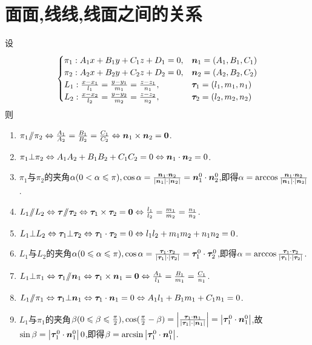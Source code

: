 \section{面面,线线,线面之间的关系}
\begin{proposition}
    设$$\begin{cases}
        \pi_1:A_1x+B_1y+C_1z+D_1=0,&\bm{n}_1=(A_1,B_1,C_1)\\
        \pi_2:A_2x+B_2y+C_2z+D_2=0,&\bm{n}_2=(A_2,B_2,C_2)\\
        L_1:\frac{x-x_1}{l_1}=\frac{y-y_1}{m_1}=\frac{z-z_1}{n_1},&\bm{\tau}_1=(l_1,m_1,n_1)\\
        L_2:\frac{x-x_2}{l_2}=\frac{y-y_2}{m_2}=\frac{z-z_2}{n_2},&\bm{\tau}_2=(l_2,m_2,n_2)
    \end{cases}$$
    则\begin{enumerate}
        \item $\pi_1/\!\!/\pi_2\Leftrightarrow\frac{A_1}{A_2}=\frac{B_1}{B_2}=\frac{C_1}{C_2}\Leftrightarrow\bm{n}_1\times\bm{n}_2=\bm{0}$.
        \item $\pi_1\bot\pi_2\Leftrightarrow A_1A_2+B_1B_2+C_1C_2=0\Leftrightarrow\bm{n}_1\cdot\bm{n}_2=0$.
        \item $\pi_1$与$\pi_2$的夹角$\alpha(0<\alpha\leqslant\pi),\cos\alpha=\frac{\bm{n}_1\cdot\bm{n}_2}{\left|\bm{n}_1\right|\cdot\left|\bm{n}_2\right|}=\bm{n}_1^0\cdot\bm{n}_2^0$,即得$\alpha=\arccos\frac{\bm{n}_1\cdot\bm{n}_2}{\left|\bm{n}_1\right|\cdot\left|\bm{n}_2\right|}$.
        \item $L_1/\!\!/ L_2\Leftrightarrow\bm{\tau}/\!\!/\bm{\tau}_2\Leftrightarrow\bm{\tau}_1\times\bm{\tau}_2=\bm{0}\Leftrightarrow\frac{l_1}{l_2}=\frac{m_1}{m_2}=\frac{n_1}{n_2}$.
        \item $L_1\bot L_2\Leftrightarrow\bm{\tau}_1\bot\bm{\tau}_2\Leftrightarrow\bm{\tau}_1\cdot\bm{\tau}_2=0\Leftrightarrow l_1l_2+m_1m_2+n_1n_2=0$.
        \item $L_1$与$L_2$的夹角$\alpha(0\leqslant\alpha\leqslant\pi),\cos\alpha=\frac{\bm{\tau}_1\cdot\bm{\tau}_2}{\left|\bm{\tau}_1\right|\cdot\left|\bm{\tau}_2\right|}=\bm{\tau}_1^0\cdot\bm{\tau}_2^0$,即得$\alpha=\arccos\frac{\bm{\tau}_1\cdot\bm{\tau}_2}{\left|\bm{\tau}_1\right|\cdot\left|\bm{\tau}_2\right|}$.
        \item $L_1\bot\pi_1\Leftrightarrow\bm{\tau}_1/\!\!/\bm{n}_1\Leftrightarrow\bm{\tau}_1\times\bm{n}_1=\bm{0}\Leftrightarrow \frac{A_1}{l_1}=\frac{B_1}{m_1}=\frac{C_1}{n_1}$.
        \item $L_1/\!\!/\pi_1\Leftrightarrow\bm{\tau}_1\bot\bm{n}_1\Leftrightarrow\bm{\tau}_1\cdot\bm{n}_1=0\Leftrightarrow A_1l_1+B_1m_1+C_1n_1=0$.
        \item $L_1$与$\pi_1$的夹角$\beta(0\leqslant\beta\leqslant\frac{\pi}{2}),\cos(\frac{\pi}{2}-\beta)=\left|\frac{\bm{\tau}_1\cdot\bm{n}_1}{\left|\bm{\tau}_1\right|\cdot\left|\bm{n}_1\right|}\right|=\left|\bm{\tau}_1^0\cdot\bm{n}_1^0\right|$,故$\sin\beta=\left|\bm{\tau}_1^0\cdot\bm{n}_1^0\right|0$,即得$\beta=\arcsin\left|\bm{\tau}_1^0\cdot\bm{n}_1^0\right|$.
    \end{enumerate}
\end{proposition}

